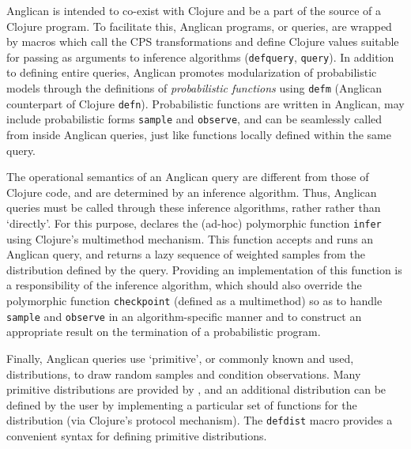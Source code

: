 \documentclass[sigconf]{acmart}
\begin{document}
\iftoggle{full}{%
Clojure is a functional language, and continuation-passing style
(CPS) transformation is a well-developed technique in the area
of functional languages. Implementing a variant of CPS
transformation seemed to be the most flexible and lightweight
option --- any other form of concurrency would put a higher
burden on the underlying runtime (JVM) and the operating system.
Consequently, Anglican has been implemented as a CPS-transformed
computation with access to continuations in probabilistic
checkpoints. 
}{%
}%

Anglican is intended to co-exist with Clojure and be a part of
the source of a Clojure program. To facilitate this, Anglican
programs, or queries, are wrapped by macros\iftoggle{full}{ (defined in the
\texttt{anglican.emit} namespace)}{} which call the CPS
transformations and define Clojure values suitable for passing
as arguments to inference algorithms (\texttt{defquery},
\texttt{query}). In addition to defining entire queries,
Anglican promotes modularization of probabilistic models through
the definitions of \textit{probabilistic functions} using
\texttt{defm} (Anglican counterpart of Clojure \texttt{defn}).
Probabilistic functions are
written in Anglican, may include probabilistic forms
\texttt{sample} and \texttt{observe}, and can be seamlessly
called from inside Anglican queries, just like functions locally
defined within the same query.

The operational semantics of an Anglican query are different from those
of Clojure code, and are determined by an inference algorithm. Thus,
Anglican queries must be called through these inference algorithms, rather
rather than `directly'. For this purpose,
\iftoggle{full}{the
\texttt{anglican.inference} namespace}{Anglican} declares the (ad-hoc) polymorphic
function \texttt{infer} using Clojure's multimethod mechanism.
This function accepts and runs an Anglican query, 
and returns a lazy sequence of weighted samples from the
distribution defined by the query. Providing an implementation of this function
is a responsibility of the inference algorithm, which should also
override the polymorphic function \texttt{checkpoint} (defined
as a multimethod) so as to handle \texttt{sample} and
\texttt{observe} in an algorithm-specific manner and
to construct an appropriate result on the
termination of a probabilistic program.

Finally, Anglican queries use `primitive', or commonly known and
used, distributions, to draw random samples and condition
observations. Many primitive distributions are provided by
\iftoggle{full}{the \texttt{anglican.runtime} namespace}{the
runtime}, and an additional distribution can be defined by the
user by implementing a particular set of functions for the
distribution (via Clojure's protocol mechanism). The
\texttt{defdist} macro provides a convenient syntax for defining
primitive distributions.
\end{document}
